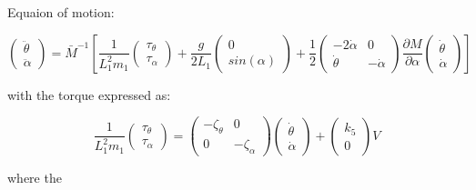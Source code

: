
Equaion of motion:

\begin{equation}
\left( \begin{matrix}
        \ddot \theta \\
        \ddot \alpha
    \end{matrix} \right) = \bar M^{-1} \left[
\frac{1}{ L_1^2 m_1}
    \left( \begin{matrix}
        \tau_{\theta} \\
        \tau_{\alpha}
    \end{matrix} \right)
    +\frac{g}{2L_1}
    \left( \begin{matrix}
        0 \\
        sin( \alpha)
    \end{matrix} \right)
     + \frac{1}{2} \left( \begin{matrix}
    - 2 \dot \alpha & 0\\
        \dot \theta & -\dot \alpha
    \end{matrix} \right)
    \frac{\partial M}{\partial \alpha}
     \left( \begin{matrix}
        \dot \theta \\
        \dot \alpha
    \end{matrix} \right) \right]
\end{equation}

with the torque expressed as:

\begin{equation}
\frac{1}{ L_1^2 m_1}
    \left( \begin{matrix}
        \tau_{\theta} \\
        \tau_{\alpha}
    \end{matrix} \right)
    = \left( \begin{matrix}
        -\zeta_\theta & 0 \\ 0 & -\zeta_\alpha
    \end{matrix}\right)
    \left( \begin{matrix}
        \dot \theta \\ \dot \alpha
    \end{matrix}\right)
    +
    \left( \begin{matrix}
    k_5 \\ 0    
    \end{matrix}\right)
    V
\end{equation}

where the
